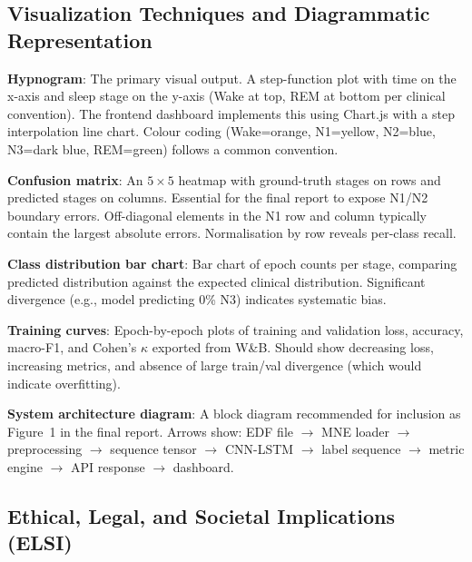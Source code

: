 \documentclass[10pt]{article}
\begin{document}
\subsection{Visualization Techniques and Diagrammatic Representation}
\label{sec:visualization}

\textbf{Hypnogram}: The primary visual output. A step-function plot with time on the x-axis and sleep stage on the y-axis (Wake at top, REM at bottom per clinical convention). The frontend dashboard implements this using Chart.js with a step interpolation line chart. Colour coding (Wake=orange, N1=yellow, N2=blue, N3=dark blue, REM=green) follows a common convention.

\textbf{Confusion matrix}: An $5 \times 5$ heatmap with ground-truth stages on rows and predicted stages on columns. Essential for the final report to expose N1/N2 boundary errors. Off-diagonal elements in the N1 row and column typically contain the largest absolute errors. Normalisation by row reveals per-class recall.

\textbf{Class distribution bar chart}: Bar chart of epoch counts per stage, comparing predicted distribution against the expected clinical distribution. Significant divergence (e.g., model predicting 0\% N3) indicates systematic bias.

\textbf{Training curves}: Epoch-by-epoch plots of training and validation loss, accuracy, macro-F1, and Cohen's $\kappa$ exported from W\&B. Should show decreasing loss, increasing metrics, and absence of large train/val divergence (which would indicate overfitting).

\textbf{System architecture diagram}: A block diagram recommended for inclusion as Figure~1 in the final report. Arrows show: EDF file $\rightarrow$ MNE loader $\rightarrow$ preprocessing $\rightarrow$ sequence tensor $\rightarrow$ CNN-LSTM $\rightarrow$ label sequence $\rightarrow$ metric engine $\rightarrow$ API response $\rightarrow$ dashboard.

\subsection{Ethical, Legal, and Societal Implications (ELSI)}
\label{sec:elsi}
\end{document}
